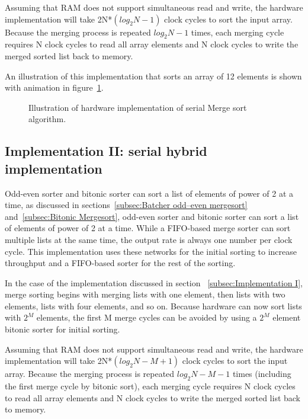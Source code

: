 \documentclass{article}
\begin{document}
Assuming that RAM does not support simultaneous read and write, the hardware implementation will take 2N*$(log_2N-1)$ clock cycles to sort the input array. Because the merging process is repeated $log_2N-1$ times, each merging cycle requires N clock cycles to read all array elements and N clock cycles to write the merged sorted list back to memory.

An illustration of this implementation that sorts an array of 12 elements is shown with animation in figure~\ref{fig:address_serial}.

\begin{figure}[H]
\centering
\caption{\label{fig:address_serial}Illustration of hardware implementation of serial Merge sort algorithm.}
\end{figure}


\subsection{Implementation II: serial hybrid implementation}
\label{subsec:Implementation II}
Odd-even sorter and bitonic sorter can sort a list of elements of power of 2 at a time, as discussed in sections~\ref{subsec:Batcher odd–even mergesort} and~\ref{subsec:Bitonic Mergesort}, odd-even sorter and bitonic sorter can sort a list of elements of power of 2 at a time. While a FIFO-based merge sorter can sort multiple lists at the same time, the output rate is always one number per clock cycle. This implementation uses these networks for the initial sorting to increase throughput and a FIFO-based sorter for the rest of the sorting.
 
In the case of the implementation discussed in section ~\ref{subsec:Implementation I}, merge sorting begins with merging lists with one element, then lists with two elements, lists with four elements, and so on. Because hardware can now sort lists with $2^M$ elements, the first M merge cycles can be avoided by using a $2^M$ element bitonic sorter for initial sorting. 

Assuming that RAM does not support simultaneous read and write, the hardware implementation will take 2N*$(log_2N-M+1)$ clock cycles to sort the input array. Because the merging process is repeated $log_2N-M-1$ times (including the first merge cycle by bitonic sort), each merging cycle requires N clock cycles to read all array elements and N clock cycles to write the merged sorted list back to memory.
\end{document}
